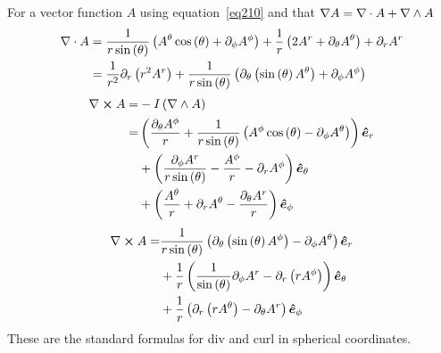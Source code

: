 For a vector function $A$ using equation~\ref{eq210} and that $\nabla A = \nabla\cdot A+\nabla\wedge A$ 
\begin{align}
\nabla \cdot A & = \frac{1}{r\operatorname{sin}\left ({\theta}\right )}\left ( A^{\theta}\operatorname{cos}\left ({\theta}\right )+\partial_{\phi}A^{\phi}\right ) +\displaystyle\frac{1}{r}\left ( 2A^{r}+                         				   \partial_{\theta}A^{\theta}\right )+\partial_{r}A^{r}\\
               & = \displaystyle\frac{1}{r^{2}}\partial_{r}\left ( r^{2}A^{r}\right )+
                    \displaystyle\frac{1}{r\operatorname{sin}\left ({\theta}\right )}\left (\partial_{\theta}\left (\operatorname{sin}\left ({\theta}\right ) A^{\theta}\right )+\partial_{\phi}A^{\phi}\right )
\end{align}
\begin{align}
\nabla \bm{\times} A =& -I\left (\nabla \wedge A\right ) \\
   =& \left ( \displaystyle\frac{\partial_{\theta} A^{\phi}}{r} + \displaystyle\frac{1}{r \operatorname{sin}\left ({\theta}\right )}\left ( A^{\phi}\operatorname{cos}\left ({\theta}\right )-
      \partial_{\phi}A^{\theta}\right )\right )\bm{\hat{e}}_{r} \\ 
	& +\left ( \displaystyle\frac{\partial_{\phi} A^{r}}{r\operatorname{sin}\left ({\theta}\right )}-\displaystyle\frac{A^{\phi}}{r}-\partial_{r}A^{\phi}\right ) \bm{\hat{e}}_{\theta} \\
	& +\left ( \displaystyle\frac{A^{\theta}}{r} + \partial_{r} A^{\theta} - \displaystyle\frac{\partial_{\theta} A^{r}}{r}\right )\bm{\hat{e}}_{\phi}
\end{align}
\begin{align}
\nabla \bm{\times} A =& \displaystyle\frac{1}{r\operatorname{sin}\left ({\theta}\right )}\left (\partial_{\theta}\left (\operatorname{sin}\left ({\theta}\right ) A^{\phi}\right )-
                       \partial_{\phi}A^{\theta} \right )\bm{\hat{e}}_{r} \\ 
	&  +\displaystyle\frac{1}{r}\left (\displaystyle\frac{1}{\operatorname{sin}\left ({\theta}\right )}\partial_{\phi}A^{r}-\partial_{r}\left ( rA^{\phi} \right )\right )\bm{\hat{e}}_{\theta} \\
	& +\displaystyle\frac{1}{r}\left (\partial_{r}\left ( rA^{\theta}\right )-\partial_{\theta}A^{r}\right )\bm{\hat{e}}_{\phi}
\end{align}
These are the standard formulas for div and curl in spherical coordinates.
